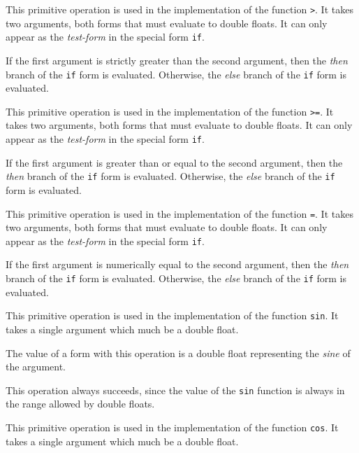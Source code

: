  {}

This primitive operation is used in the implementation of the
\commonlisp{} function \texttt{>}.  It takes two arguments, both forms
that must evaluate to double floats.  It can only appear as the
\emph{test-form} in the special form \texttt{if}.

If the first argument is strictly greater than the second argument,
then the \emph{then} branch of the \texttt{if} form is evaluated.
Otherwise, the \emph{else} branch of the \texttt{if} form is
evaluated.

 {}

This primitive operation is used in the implementation of the
\commonlisp{} function \texttt{>=}.  It takes two arguments, both forms
that must evaluate to double floats.  It can only appear as the
\emph{test-form} in the special form \texttt{if}.

If the first argument is greater than or equal to the second argument,
then the \emph{then} branch of the \texttt{if} form is evaluated.
Otherwise, the \emph{else} branch of the \texttt{if} form is
evaluated.

 {}

This primitive operation is used in the implementation of the
\commonlisp{} function \texttt{=}.  It takes two arguments, both forms
that must evaluate to double floats.  It can only appear as the
\emph{test-form} in the special form \texttt{if}.

If the first argument is numerically equal to the second argument,
then the \emph{then} branch of the \texttt{if} form is evaluated.
Otherwise, the \emph{else} branch of the \texttt{if} form is
evaluated.

 {}

This primitive operation is used in the implementation of the
\commonlisp{} function \texttt{sin}.  It takes a single argument which
much be a double float.

The value of a form with this operation is a double float representing
the \emph{sine} of the argument.

This operation always succeeds, since the value of the \texttt{sin}
function is always in the range allowed by double floats.

 {}

This primitive operation is used in the implementation of the
\commonlisp{} function \texttt{cos}.  It takes a single argument which
much be a double float.

